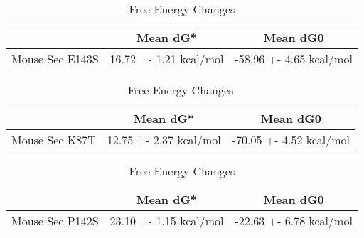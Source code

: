                             \begin{table}[ht]
                              \centering
                              \begin{tabular}{|c|c|c|}
                              \hline
                                & Mean dG* & Mean dG0 \\
                              \hline
                              Mouse Sec  E143S & 16.72 +- 1.21 kcal/mol & -58.96 +- 4.65 kcal/mol \\
                              \hline
                              \end{tabular}
                              \caption{Free Energy Changes}
                              \end{table}

                              \begin{table}[ht]
                                \centering
                                \begin{tabular}{|c|c|c|}
                                \hline
                                  & Mean dG* & Mean dG0 \\
                                \hline
                                Mouse Sec K87T & 12.75 +- 2.37 kcal/mol & -70.05 +- 4.52 kcal/mol \\
                                \hline
                                \end{tabular}
                                \caption{Free Energy Changes}
                                \end{table}
                       
                            
                            \begin{table}[ht]
                              \centering
                              \begin{tabular}{|c|c|c|}
                              \hline
                                & Mean dG* & Mean dG0 \\
                              \hline
                              Mouse Sec P142S & 23.10 +- 1.15 kcal/mol & -22.63 +- 6.78 kcal/mol \\
                              \hline
                              \end{tabular}
                              \caption{Free Energy Changes}
                              \end{table}
                            
